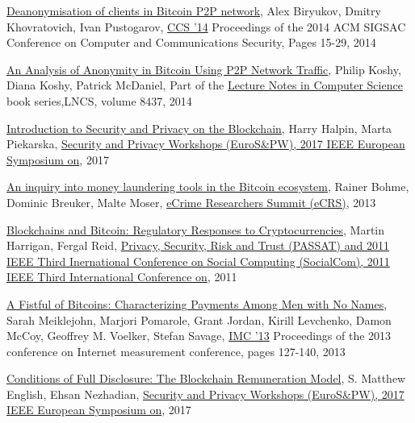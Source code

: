 \begin{thebibliography}{1}
\href{https://arxiv.org/pdf/1405.7418.pdf}{Deanonymisation of clients in
Bitcoin P2P network}, Alex Biryukov, Dmitry Khovratovich, Ivan Pustogarov,
\href{http://www.sigsac.org/ccs/CCS2014/}{CCS '14} Proceedings of the 2014 ACM
SIGSAC Conference on Computer and Communications Security, Pages 15-29, 2014

\href{https://www.ifca.ai/fc14/papers/fc14_submission_71.pdf}{An Analysis of
Anonymity in Bitcoin Using P2P Network Traffic}, Philip Koshy, Diana Koshy,
Patrick McDaniel, Part of the \href{https://link.springer.com/bookseries/558}
{Lecture Notes in Computer Science} book series,LNCS, volume 8437, 2014

\href{https://hal.inria.fr/hal-01673293/document}{Introduction to Security and
Privacy on the Blockchain}, Harry Halpin, Marta Piekarska,
\href{http://ieeexplore.ieee.org/xpl/mostRecentIssue.jsp?punumber=7966454}
{Security and Privacy Workshops (EuroS\&PW), 2017 IEEE European Symposium on},
2017

\href{http://ieeexplore.ieee.org/document/6805780/}{An inquiry into money
laundering tools in the Bitcoin ecosystem}, Rainer Bohme, Dominic Breuker,
Malte Moser,
\href{http://ieeexplore.ieee.org/xpl/mostRecentIssue.jsp?punumber=6802823}
{eCrime Researchers Summit (eCRS)}, 2013

\href{https://papers.ssrn.com/sol3/papers.cfm?abstract_id=2704852}
{Blockchains and Bitcoin: Regulatory Responses to Cryptocurrencies}, 
Martin Harrigan, Fergal Reid, 
\href{http://ieeexplore.ieee.org/xpl/mostRecentIssue.jsp?punumber=6112285}
{Privacy, Security, Risk and Trust (PASSAT) and 2011 IEEE Third Inernational
Conference on Social Computing (SocialCom), 2011 IEEE Third International
Conference on}, 2011

\href{https://cseweb.ucsd.edu/~smeiklejohn/files/imc13.pdf}{A Fistful of
Bitcoins: Characterizing Payments Among Men with No Names}, Sarah Meiklejohn,
Marjori Pomarole, Grant Jordan, Kirill Levchenko, Damon McCoy, Geoffrey M.
Voelker, Stefan Savage, 
\href{http://www.sigcomm.org/events/imc-conference/}{IMC '13} Proceedings of
the 2013 conference on Internet measurement conference, pages 127-140, 2013

\href{http://ieeexplore.ieee.org/document/7966972/}{Conditions of Full
Disclosure: The Blockchain Remuneration Model}, S. Matthew English, 
Ehsan Nezhadian,
\href{http://ieeexplore.ieee.org/xpl/mostRecentIssue.jsp?punumber=7966454}
{Security and Privacy Workshops (EuroS\&PW), 2017 IEEE European Symposium on},
2017


\end{thebibliography}
